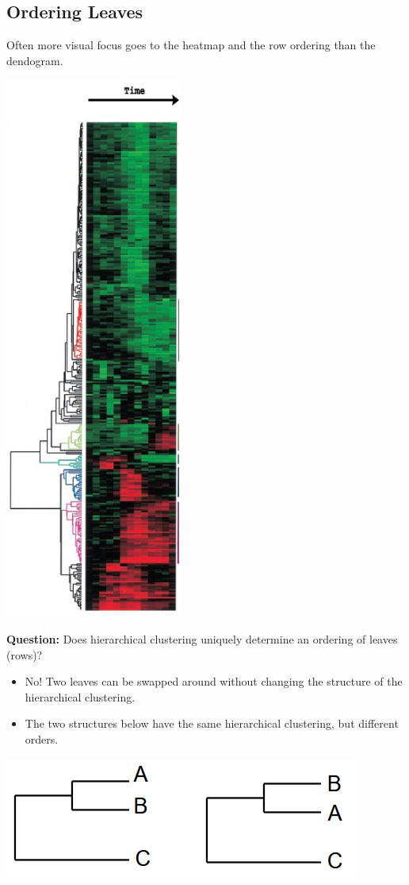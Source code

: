 \documentclass[10pt]{article}
\begin{document}
\subsection*{Ordering Leaves}
Often more visual focus goes to the heatmap and the row ordering than the dendogram.  
\begin{center}
    \includegraphics[scale=0.5]{W6_16.png}
\end{center}
\textbf{Question:} Does hierarchical clustering uniquely determine an ordering of leaves (rows)?
\begin{itemize}
    \item No!  Two leaves can be swapped around without changing the structure of the hierarchical clustering.
    \item The two structures below have the same hierarchical clustering, but different orders.
\end{itemize}
\begin{center}
    \includegraphics[scale=0.8]{W6_17.png}
\end{center}
\end{document}
